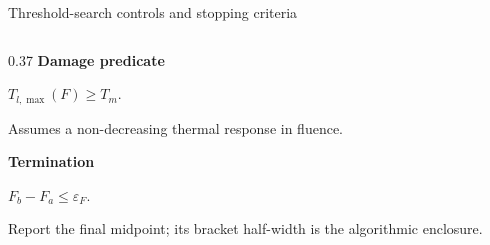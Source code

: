 \documentclass[aspectratio=169,10pt]{beamer}
\begin{document}
\begin{frame}[t]{Threshold-search controls and stopping criteria}
\begin{columns}[T,totalwidth=0.94\textwidth]
\begin{column}{0.37\textwidth}
      \small\textbf{\color{GVCouplingOrange}Damage predicate}\par
      \vspace{0.05cm}
      \centering\(T_{l,\max}(F)\geq T_m.\)\par
      \raggedright\scriptsize\color{GVSlate}Assumes a non-decreasing thermal response in fluence.\par
      \vspace{0.18cm}
      \small\textbf{\color{GVSourceBlue}Termination}\par
      \vspace{0.05cm}
      \centering\(F_b-F_a\leq\varepsilon_F.\)\par
      \raggedright\scriptsize\color{GVSlate}Report the final midpoint; its bracket half-width is the algorithmic enclosure.
    \end{column}
  \end{columns}
\end{frame}
\end{document}
